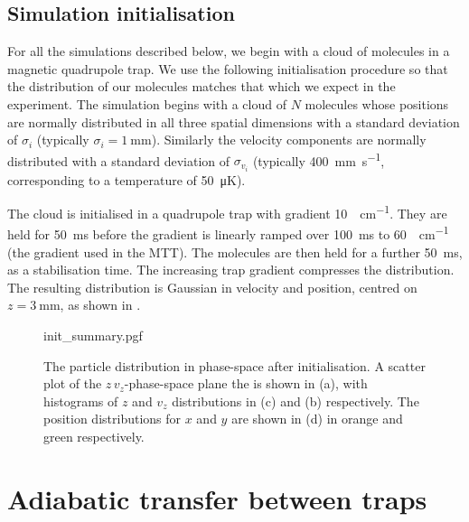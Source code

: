 
\subsection{Simulation initialisation}
\label{sim:sim:init}

For all the simulations described below, we begin with a cloud of molecules in
a magnetic quadrupole trap. We use the following initialisation procedure so
that the distribution of our molecules matches that which we expect in the
experiment. 
%
The simulation begins with a cloud of $N$ molecules whose positions are normally distributed
in all three spatial dimensions with a standard deviation of $\sigma_i$
(typically $\sigma_i = \SI{1}{\milli\meter}$). Similarly the velocity components
are normally distributed with a standard deviation of $\sigma_{v_i}$ (typically
\SI{400}{\milli\meter\per\second}, corresponding to a temperature of
\SI{50}{\micro\kelvin}). 

The cloud is initialised in a quadrupole trap with gradient
\SI{10}{\gauss\per\centi\meter}. They are held for \SI{50}{\milli\second}
before the gradient is linearly ramped over \SI{100}{\milli\second} to
\SI{60}{\gauss\per\centi\meter} (the gradient used in the MTT).  The molecules are
then held for a further \SI{50}{\milli\second}, as a stabilisation time. The
increasing trap gradient compresses the distribution. The resulting
distribution is Gaussian in velocity and position, centred on
$z=\SI{3}{\milli\meter}$, as shown in .

\begin{figure}[htb]
\centering
  {init_summary.pgf}
  \caption[Phase-space simulation initialisation]{
    The particle distribution in phase-space after initialisation. A
  scatter plot of the $z\,v_z$-phase-space plane the is shown in (a), with
  histograms of $z$ and $v_z$ distributions in (c) and (b) respectively. The
  position distributions for $x$ and $y$ are shown in (d) in orange and green
  respectively.}
  \label{sim:fig:initsum}
\end{figure}

\section{Adiabatic transfer between traps}
\label{sim:adiabatic}


